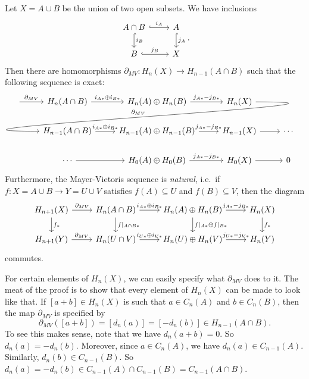 \documentclass[a4paper]{article}
\theoremstyle{definition}
\begin{document}
\begin{thm}
  Let $X = A \cup B$ be the union of two open subsets. We have inclusions
  \[
    \begin{tikzcd}
      A \cap B \ar[r, "i_A", hook] \ar[d, "i_B", hook] & A \ar[d, hook, "j_A"]\\
      B \ar[r, hook, "j_B"] & X
    \end{tikzcd}.
  \]
  Then there are homomorphisms $\partial_{MV}: H_n(X) \to H_{n - 1}(A \cap B)$ such that the following sequence is exact:
  \[
    \begin{tikzcd}
      \ar[r, "\partial_{MV}"] & H_n(A \cap B) \ar[r, "i_{A*} \oplus i_{B*}"] & H_n(A) \oplus H_n(B) \ar[r, "j_{A*} - j_{B*}"] & H_n(X)\ar[out=0, in=180, looseness=2, overlay, lld, "\partial_{MV}"']\\
      & H_{n - 1}(A \cap B) \ar[r, "i_{A*} \oplus i_{B*}"] & H_{n - 1}(A) \oplus H_{n - 1}(B) \ar[r, "j_{A*} - j_{B*}"] & H_{n - 1}(X) \ar [r] & \cdots\\
      &\cdots \ar[r] & H_0(A) \oplus H_0(B) \ar[r, "j_{A*} - j_{B*}"] & H_0(X) \ar [r] & 0
    \end{tikzcd}
  \]
  Furthermore, the Mayer-Vietoris sequence is \emph{natural}, i.e.\ if $f: X = A\cup B \to Y = U \cup V$ satisfies $f(A) \subseteq U$ and $f(B) \subseteq V$, then the diagram
  \[
    \begin{tikzcd}
       H_{n + 1}(X) \ar[r, "\partial_{MV}"] \ar[d, "f_*"] & H_{n}(A \cap B) \ar[r, "i_{A*} \oplus i_{B*}"] \ar[d, "f|_{A \cap B*}"] & H_n(A) \oplus H_n(B) \ar[r, "j_{A*} - j_{B*}"] \ar[d, "f|_{A*} \oplus f|_{B*}"] & H_n(X) \ar[d, "f_*"]\\
       H_{n + 1}(Y) \ar[r, "\partial_{MV}"] & H_{n}(U \cap V) \ar[r, "i_{U*} \oplus i_{V*}"] & H_n(U) \oplus H_n(V) \ar[r, "j_{U*} - j_{V*}"] & H_n(Y)
    \end{tikzcd}
  \]
  commutes.
\end{thm}
For certain elements of $H_n(X)$, we can easily specify what $\partial_{MV}$ does to it. The meat of the proof is to show that every element of $H_n(X)$ can be made to look like that. If $[a + b] \in H_n(X)$ is such that $a \in C_n(A)$ and $b \in C_n(B)$, then the map $\partial_{MV}$ is specified by
\[
  \partial_{MV}([a + b]) = [d_n(a)] = [-d_n(b)] \in H_{n - 1}(A \cap B).
\]
To see this makes sense, note that we have $d_n(a + b) = 0$. So $d_n(a) = - d_n(b)$. Moreover, since $a \in C_n(A)$, we have $d_n(a) \in C_{n - 1}(A)$. Similarly, $d_n(b) \in C_{n - 1}(B)$. So $d_n(a) = - d_n(b) \in C_{n - 1}(A) \cap C_{n - 1}(B) = C_{n - 1}(A \cap B)$.
\end{document}
